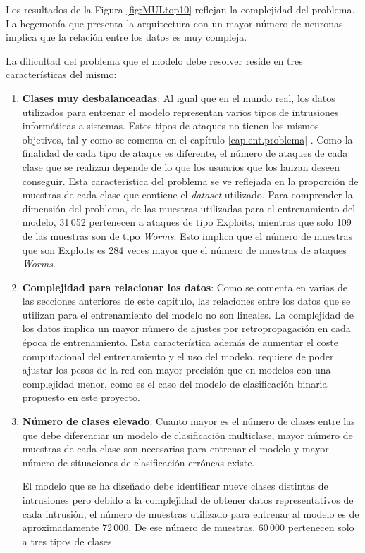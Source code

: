 Los resultados de la Figura \ref{fig:MULtop10} reflejan la complejidad del problema. La hegemonía que presenta la arquitectura con un mayor número de neuronas implica que la relación entre los datos es muy compleja. 

La dificultad del problema que el modelo debe resolver reside en tres características del mismo:

\begin{enumerate}
	\item \textbf{Clases muy desbalanceadas}: Al igual que en el mundo real, los datos utilizados para entrenar el modelo representan varios tipos de intrusiones informáticas a sistemas. Estos tipos de ataques no tienen los mismos objetivos, tal y como se comenta en el capítulo \ref{cap.ent.problema} . Como la finalidad de cada tipo de ataque es diferente, el número de ataques de cada clase que se realizan depende de lo que los usuarios que los lanzan deseen conseguir. Esta característica del problema se ve reflejada en la proporción de muestras de cada clase que contiene el \textit{dataset} utilizado. Para comprender la dimensión del problema, de las muestras utilizadas para el entrenamiento del modelo, 31\,052 pertenecen a ataques de tipo Exploits, mientras que solo 109 de las muestras son de tipo \textit{Worms}. Esto implica que el número de muestras que son Exploits es 284 veces mayor que el número de muestras de ataques \textit{Worms}.
	
	\item \textbf{Complejidad para relacionar los datos}: Como se comenta en varias de las secciones anteriores de este capítulo, las relaciones entre los datos que se utilizan para el entrenamiento del modelo no son lineales. La complejidad de los datos implica un mayor número de ajustes por retropropagación en cada época de entrenamiento. Esta característica además de aumentar el coste computacional del entrenamiento y el uso del modelo, requiere de poder ajustar los pesos de la red con mayor precisión que en modelos con una complejidad menor, como es el caso del modelo de clasificación binaria propuesto en este proyecto.
	
	\item \textbf{Número de clases elevado}: Cuanto mayor es el número de clases entre las que debe diferenciar un modelo de clasificación multiclase, mayor número de muestras de cada clase son necesarias para entrenar el modelo y mayor número de situaciones de clasificación erróneas existe. 
	
	El modelo que se ha diseñado debe identificar nueve clases distintas de intrusiones pero debido a la complejidad de obtener datos representativos de cada intrusión, el número de muestras utilizado para entrenar al modelo es de aproximadamente 72\,000. De ese número de muestras, 60\,000 pertenecen solo a tres tipos de clases.
	

\end{enumerate}
